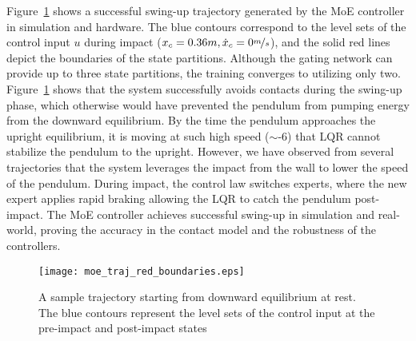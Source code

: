 Figure~\ref{fig:cartpole_trajectory} shows a successful swing-up trajectory
generated by the MoE controller in simulation and hardware.
%
The blue contours correspond to the level sets of the control input $u$ during
impact ($x_c=0.36m, \dot{x}_c = 0\nicefrac{m}{s}$), and the solid red lines
depict the boundaries of the state partitions.
%
Although the gating network can provide up to three state partitions,
the training converges to utilizing only two.
%
Figure~\ref{fig:cartpole_trajectory} shows that the system successfully avoids
contacts during the swing-up phase, which otherwise would have prevented the
pendulum from pumping energy from the downward equilibrium.
%
By the time the pendulum approaches the upright equilibrium, it is moving at
such high speed ($\sim$-6) that LQR cannot stabilize the
pendulum to the upright.
%
However, we have observed from several trajectories that the system leverages
the impact from the wall to lower the speed of the pendulum.
%
During impact, the control law switches experts, where the new expert applies
rapid braking allowing the LQR to catch the pendulum post-impact.
%
The MoE controller achieves successful swing-up in simulation and real-world,
proving the accuracy in the contact model and the robustness of the
controllers.
\begin{figure}[tb]
    \centering
    \texttt{[image: moe\_traj\_red\_boundaries.eps]}
    \caption{A sample trajectory starting from
    downward equilibrium at rest. The blue contours represent the level sets of
    the control input at the pre-impact and post-impact states}
    \label{fig:cartpole_trajectory}
\end{figure}
